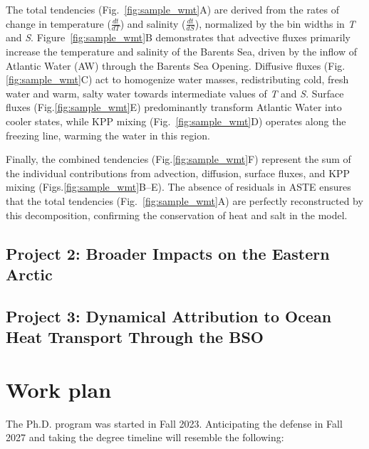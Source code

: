 \documentclass[draft]{agujournal2019}
\begin{document}
The total tendencies (Fig.~\ref{fig:sample_wmt}A) are derived from the rates of change in temperature ($\frac{dt}{dT}$) and salinity ($\frac{dt}{dS}$), normalized by the bin widths in \emph{T} and \emph{S}. Figure~\ref{fig:sample_wmt}B demonstrates that advective fluxes primarily increase the temperature and salinity of the Barents Sea, driven by the inflow of Atlantic Water (AW) through the Barents Sea Opening. Diffusive fluxes (Fig.\ref{fig:sample_wmt}C) act to homogenize water masses, redistributing cold, fresh water and warm, salty water towards intermediate values of \emph{T} and \emph{S}. Surface fluxes (Fig.\ref{fig:sample_wmt}E) predominantly transform Atlantic Water into cooler states, while KPP mixing (Fig.~\ref{fig:sample_wmt}D) operates along the freezing line, warming the water in this region.

Finally, the combined tendencies (Fig.\ref{fig:sample_wmt}F) represent the sum of the individual contributions from advection, diffusion, surface fluxes, and KPP mixing (Figs.\ref{fig:sample_wmt}B--E). The absence of residuals in ASTE ensures that the total tendencies (Fig.~\ref{fig:sample_wmt}A) are perfectly reconstructed by this decomposition, confirming the conservation of heat and salt in the model.


\subsection{Project 2: Broader Impacts on the Eastern Arctic}



\subsection{Project 3: Dynamical Attribution to Ocean Heat Transport Through the BSO}

\section{Work plan}
    The Ph.D. program was started in Fall 2023. Anticipating the defense in Fall 2027 and taking  the degree timeline will resemble the following:
\end{document}
